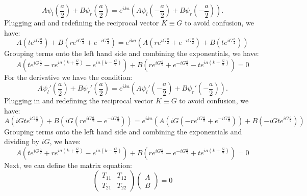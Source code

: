 \documentclass[12pt]{article}
\begin{document}
\begin{equation}
    A\psi_l(\frac{a}{2}) + B\psi_r(\frac{a}{2}) = e^{ika}\left(A\psi_l(-\frac{a}{2}) + B\psi_r(-\frac{a}{2})\right).
\end{equation}
Plugging and and redefining the reciprocal vector $K\equiv G$ to avoid confusion, we have:
\begin{equation}
    A\left(t e^{iG\frac{a}{2}}\right) + B\left(re^{iG\frac{a}{2}} + e^{-iG\frac{a}{2}}\right) = e^{ika}\left(A\left(re^{iG\frac{a}{2}} + e^{-iG\frac{a}{2}}\right) + B\left(te^{iG\frac{a}{2}}\right)\right)
\end{equation}
Grouping terms onto the left hand side and combining the exponentials, we have:
\begin{equation}
    A\left(t e^{iG\frac{a}{2}} - re^{ia\left(k+\frac{G}{2} \right)} - e^{ia\left(k-\frac{G}{2} \right)}\right) + B\left(re^{iG\frac{a}{2}} + e^{-iG\frac{a}{2}} - te^{ia\left(k+\frac{G}{2} \right)}\right) = 0
\end{equation}
For the derivative we have the condition:
\begin{equation}
    A\psi_l'(\frac{a}{2}) + B\psi_r'(\frac{a}{2}) = e^{ika}\left(A\psi_l'(-\frac{a}{2}) + B\psi_r'(-\frac{a}{2})\right).
\end{equation}
Plugging in and redefining the reciprocal vector $K\equiv G$ to avoid confusion, we have:
\begin{equation}
    A\left(iGte^{iG\frac{a}{2}}\right) + B\left(iG\left(re^{iG\frac{a}{2}} - e^{-iG\frac{a}{2}}\right)\right) = e^{ika}\left(A\left(iG\left(-re^{iG\frac{a}{2}} + e^{-iG\frac{a}{2}}\right)\right) + B\left(-iGte^{iG\frac{a}{2}}\right)\right)
\end{equation}
Grouping terms onto the left hand side and combining the exponentials and dividing by $iG$, we have:
\begin{equation}
    A\left(t e^{iG\frac{a}{2}} + re^{ia\left(k+\frac{G}{2} \right)} - e^{ia\left(k-\frac{G}{2} \right)}\right) + B\left(re^{iG\frac{a}{2}} - e^{-iG\frac{a}{2}} + te^{ia\left(k+\frac{G}{2} \right)}\right) = 0
\end{equation}
Next, we can define the matrix equation:
\begin{equation}
    \begin{pmatrix}
        T_{11} & T_{12} \\
        T_{21} & T_{22}
    \end{pmatrix}
    \begin{pmatrix}
        A \\
        B
    \end{pmatrix} = 0
\end{equation}
\end{document}
